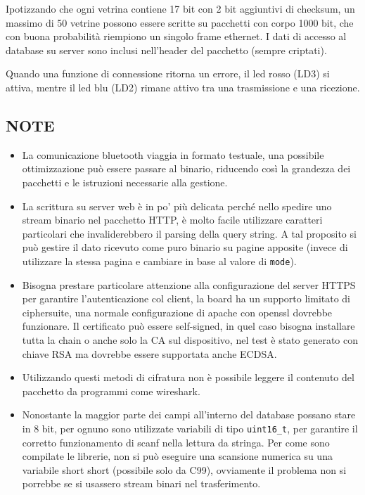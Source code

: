 Ipotizzando che ogni vetrina contiene 17 bit con 2 bit aggiuntivi di checksum, un massimo di 50 vetrine possono essere scritte su pacchetti con corpo 1000 bit, che con buona probabilit\`a riempiono un singolo frame ethernet. I dati di accesso al database su server sono inclusi nell'header del pacchetto (sempre criptati).

Quando una funzione di connessione ritorna un errore, il led rosso (LD3) si attiva, mentre il led blu (LD2) rimane attivo tra una trasmissione e una ricezione.

\subsection{NOTE}
\begin{itemize}
\item La comunicazione bluetooth viaggia in formato testuale, una possibile ottimizzazione pu\`o essere passare al binario, riducendo cos\`i la grandezza dei pacchetti e le istruzioni necessarie alla gestione. 
\item La scrittura su server web \`e in po' pi\`u delicata perch\'e nello spedire uno stream binario nel pacchetto HTTP, \`e molto facile utilizzare caratteri particolari che invaliderebbero il parsing della query string. A tal proposito si pu\`o gestire il dato ricevuto come puro binario su pagine apposite (invece di utilizzare la stessa pagina e cambiare in base al valore di \texttt{mode}).
\item Bisogna prestare particolare attenzione alla configurazione del server HTTPS per garantire l'autenticazione col client, la board ha un supporto limitato di ciphersuite, una normale configurazione di apache con openssl dovrebbe funzionare. Il certificato pu\`o essere self-signed, in quel caso bisogna installare tutta la chain o anche solo la CA sul dispositivo, nel test \`e stato generato con chiave RSA ma dovrebbe essere supportata anche ECDSA.
\item Utilizzando questi metodi di cifratura non \`e possibile leggere il contenuto del pacchetto da programmi come wireshark.
\item Nonostante la maggior parte dei campi all'interno del database possano stare in 8 bit, per ognuno sono utilizzate variabili di tipo \texttt{uint16\_t}, per garantire il corretto funzionamento di scanf nella lettura da stringa. Per come sono compilate le librerie, non si pu\`o eseguire una scansione numerica su una variabile short short (possibile solo da C99), ovviamente il problema non si porrebbe se si usassero stream binari nel trasferimento.

\end{itemize}
